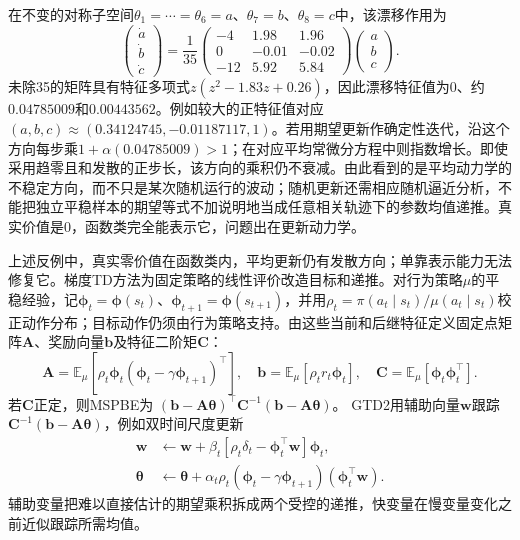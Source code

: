 在不变的对称子空间$\theta_1=\cdots=\theta_6=a$、$\theta_7=b$、$\theta_8=c$中，该漂移作用为
\begin{equation}
  \begin{pmatrix}\dot a\\\dot b\\\dot c\end{pmatrix}
  =
  \frac1{35}
  \begin{pmatrix}
    -4 & 1.98 & 1.96\\
     0 & -0.01 & -0.02\\
    -12 & 5.92 & 5.84
  \end{pmatrix}
  \begin{pmatrix}a\\b\\c\end{pmatrix}.
  \label{eq:rl-learning-baird-reduced}
\end{equation}
未除35的矩阵具有特征多项式$z(z^2-1.83z+0.26)$，因此漂移特征值为$0$、约$0.04785009$和$0.00443562$。例如较大的正特征值对应$(a,b,c)\approx(0.34124745,-0.01187117,1)$。若用期望更新作确定性迭代，沿这个方向每步乘$1+\alpha(0.04785009)>1$；在对应平均常微分方程中则指数增长。即使采用趋零且和发散的正步长，该方向的乘积仍不衰减。由此看到的是平均动力学的不稳定方向，而不只是某次随机运行的波动；随机更新还需相应随机逼近分析，不能把独立平稳样本的期望等式不加说明地当成任意相关轨迹下的参数均值递推。真实价值是0，函数类完全能表示它，问题出在更新动力学。

上述反例中，真实零价值在函数类内，平均更新仍有发散方向；单靠表示能力无法修复它。梯度TD方法为固定策略的线性评价改造目标和递推。对行为策略$\mu$的平稳经验，记$\bm\phi_t=\bm\phi(s_t)$、$\bm\phi_{t+1}=\bm\phi(s_{t+1})$，并用$\rho_t=\pi(a_t\mid s_t)/\mu(a_t\mid s_t)$校正动作分布；目标动作仍须由行为策略支持。由这些当前和后继特征定义固定点矩阵$\bm A$、奖励向量$\bm b$及特征二阶矩$\bm C$：
\[
  \bm{A}=\mathbb E_\mu[\rho_t\bm{\phi}_t
          (\bm{\phi}_t-\gamma\bm{\phi}_{t+1})^\top],\quad
  \bm{b}=\mathbb E_\mu[\rho_t r_t\bm{\phi}_t],\quad
  \bm{C}=\mathbb E_\mu[\bm{\phi}_t\bm{\phi}_t^\top].
\]
若$\bm C$正定，则MSPBE为
$(\bm b-\bm A\bm\theta)^\top\bm C^{-1}
 (\bm b-\bm A\bm\theta)$。
GTD2用辅助向量$\bm w$跟踪$\bm C^{-1}(\bm b-\bm A\bm\theta)$，例如双时间尺度更新
\begin{align}
  \bm w&\leftarrow\bm w+\beta_t
     [\rho_t\delta_t-\bm\phi_t^\top\bm w]\bm\phi_t,
     \nonumber\\
  \bm\theta&\leftarrow\bm\theta+\alpha_t\rho_t
     (\bm\phi_t-\gamma\bm\phi_{t+1})(\bm\phi_t^\top\bm w).
  \label{eq:rl-learning-gtd2}
\end{align}
辅助变量把难以直接估计的期望乘积拆成两个受控的递推，快变量在慢变量变化之前近似跟踪所需均值。

